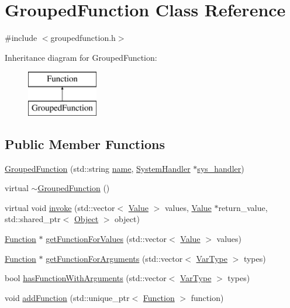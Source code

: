 \hypertarget{classGroupedFunction}{}\section{Grouped\+Function Class Reference}
\label{classGroupedFunction}


{\ttfamily \#include $<$groupedfunction.\+h$>$}

Inheritance diagram for Grouped\+Function\+:\begin{figure}[H]
\begin{center}
\leavevmode
\includegraphics[height=2.000000cm]{classGroupedFunction}
\end{center}
\end{figure}
\subsection*{Public Member Functions}
\begin{DoxyCompactItemize}
\item 
\hyperlink{classGroupedFunction_a613f536552aeb5b85e363d8f5b24a87f}{Grouped\+Function} (std\+::string \hyperlink{classFunction_a161d1ceb4f67f3222caf429fea7b71f1}{name}, \hyperlink{classSystemHandler}{System\+Handler} $\ast$\hyperlink{classGroupedFunction_a932d46ac0e35f1a1c989427e51c1b2b4}{sys\+\_\+handler})
\item 
virtual \hyperlink{classGroupedFunction_a5f3c1ed74083a0b9f1dea5ae2f287e70}{$\sim$\+Grouped\+Function} ()
\item 
virtual void \hyperlink{classGroupedFunction_a90a74bd39250863046a7cb97ce013d2b}{invoke} (std\+::vector$<$ \hyperlink{classValue}{Value} $>$ values, \hyperlink{classValue}{Value} $\ast$return\+\_\+value, std\+::shared\+\_\+ptr$<$ \hyperlink{classObject}{Object} $>$ object)
\item 
\hyperlink{classFunction}{Function} $\ast$ \hyperlink{classGroupedFunction_a216ffc5f08fe1bc61968f4a5f5e99b49}{get\+Function\+For\+Values} (std\+::vector$<$ \hyperlink{classValue}{Value} $>$ values)
\item 
\hyperlink{classFunction}{Function} $\ast$ \hyperlink{classGroupedFunction_a4aa6efd8e1ec521964b7826249458f27}{get\+Function\+For\+Arguments} (std\+::vector$<$ \hyperlink{classVarType}{Var\+Type} $>$ types)
\item 
bool \hyperlink{classGroupedFunction_a40cb1ca76aaf883d8c8af39b33eaa74b}{has\+Function\+With\+Arguments} (std\+::vector$<$ \hyperlink{classVarType}{Var\+Type} $>$ types)
\item 
void \hyperlink{classGroupedFunction_ab019d13e239da992fc6fbe01bc5be8ef}{add\+Function} (std\+::unique\+\_\+ptr$<$ \hyperlink{classFunction}{Function} $>$ function)
\end{DoxyCompactItemize}
